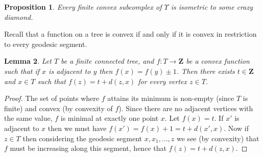 \documentclass[a4paper, 11pt]{article}
\theoremstyle{plain}
\newtheorem{proposition}{Proposition}[section]
\newtheorem{lemma}[proposition]{Lemma}
\theoremstyle{definition}
\theoremstyle{remark}
\newcommand{\ZZ}{\mathbf{Z}}                          %
\begin{document}
\begin{proposition}\label{prop:cvxWT}
Every finite convex subcomplex of $\Upsilon$ is isometric to some crazy diamond.
\end{proposition}

Recall that a function on a tree is convex if and only if it is convex in restriction to every geodesic segment.

\begin{lemma}\label{lem:fonT}
Let $T$ be a finite connected tree, and $f:T\to \ZZ$ be a convex function such that if $x$ is adjacent to $y$ then $f(x)=f(y)\pm 1$.
Then there exists $t\in \ZZ$ and $x\in T$ such that $f(z)=t+d(z,x)$ for every vertex $z\in T$.
\end{lemma}

\begin{proof}
The set of points where $f$ attains its minimum is non-empty (since $T$ is finite) and convex (by convexity of $f$). Since there are no adjacent vertices with the same value, $f$ is minimal at exactly one point $x$. Let $f(x)=t$. If $x'$ is adjacent to $x$ then we must have $f(x')=f(x)+1=t+d(x',x)$. Now if $z\in T$ then considering the geodesic segment $x,x_1,\dots,z$ we see (by convexity) that $f$ must be increasing along this segment, hence that $f(z)=t+d(z,x)$.
\end{proof}
\end{document}
